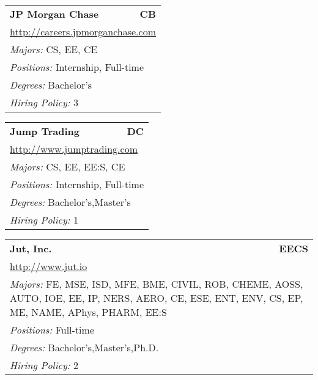 \documentclass[twoside]{article}
\begin{document}
\begin{center}
\begin{multicols}{3}
\begin{FlushLeft}
\begin{minipage}{\columnwidth}
\end{minipage}
 
\begin{minipage}{\columnwidth}\begin{tabularx}{.95\columnwidth}{Xr}
                 {\Large\bf JP Morgan Chase} & {\Large\bf CB}\\
    \multicolumn{2}{p{.95\columnwidth}}{\url{http://careers.jpmorganchase.com}}\\
    \multicolumn{2}{p{.95\columnwidth}}{\emph{Majors:} CS, EE, CE}\\
    \multicolumn{2}{p{.95\columnwidth}}{\emph{Positions:} Internship, Full-time}\\
    \multicolumn{2}{p{.95\columnwidth}}{\emph{Degrees:} Bachelor's}\\
    \multicolumn{2}{p{.95\columnwidth}}{\emph{Hiring Policy:} 3}\\
    \end{tabularx}
    
\end{minipage}
 
\begin{minipage}{\columnwidth}\begin{tabularx}{.95\columnwidth}{Xr}
                 {\Large\bf Jump Trading} & {\Large\bf DC}\\
    \multicolumn{2}{p{.95\columnwidth}}{\url{http://www.jumptrading.com}}\\
    \multicolumn{2}{p{.95\columnwidth}}{\emph{Majors:} CS, EE, EE:S, CE}\\
    \multicolumn{2}{p{.95\columnwidth}}{\emph{Positions:} Internship, Full-time}\\
    \multicolumn{2}{p{.95\columnwidth}}{\emph{Degrees:} Bachelor's,Master's}\\
    \multicolumn{2}{p{.95\columnwidth}}{\emph{Hiring Policy:} 1}\\
    \end{tabularx}
    
\end{minipage}
 
\begin{minipage}{\columnwidth}\begin{tabularx}{.95\columnwidth}{Xr}
                 {\Large\bf Jut, Inc.} & {\Large\bf EECS}\\
    \multicolumn{2}{p{.95\columnwidth}}{\url{http://www.jut.io}}\\
    \multicolumn{2}{p{.95\columnwidth}}{\emph{Majors:} FE, MSE, ISD, MFE, BME, CIVIL, ROB, CHEME, AOSS, AUTO, IOE, EE, IP, NERS, AERO, CE, ESE, ENT, ENV, CS, EP, ME, NAME, APhys, PHARM, EE:S}\\
    \multicolumn{2}{p{.95\columnwidth}}{\emph{Positions:} Full-time}\\
    \multicolumn{2}{p{.95\columnwidth}}{\emph{Degrees:} Bachelor's,Master's,Ph.D.}\\
    \multicolumn{2}{p{.95\columnwidth}}{\emph{Hiring Policy:} 2}\\
    \end{tabularx}
    

\end{minipage}
\end{FlushLeft}
\end{multicols}
\end{center}
\end{document}
